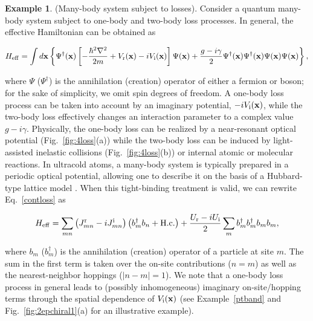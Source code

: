 \documentclass{tADP2e}
\theoremstyle{plain}
\newcommand{\eqn}[1]{
\begin{eqnarray}
	#1
\end{eqnarray}
}
\theoremstyle{plain}
\theoremstyle{definition}
\newtheorem{example}{Example}[section]
\newcommand{\exmp}[1]{
\begin{example}
	#1
\end{example}
}
\begin{document}
\exmp{(Many-body system subject to losses). 
Consider a quantum many-body system subject to one-body and two-body loss processes. In general, the effective Hamiltonian can be obtained as
\eqn{\label{contloss}
H_{{\rm eff}}=\int d{\bf x}\left\{ \Psi^{\dagger}({\bf x})\left[-\frac{\hbar^{2}\nabla^{2}}{2m}+V_{\rm r}({\bf x})-iV_{\rm i}({\bf x})\right]\Psi({\bf x})+\frac{g-i\gamma}{2}\Psi^{\dagger}({\bf x})\Psi^{\dagger}({\bf x})\Psi({\bf x})\Psi({\bf x})\right\}, \nonumber\\
}
where $\Psi$ ($\Psi^\dagger$) is the annihilation (creation) operator of either a fermion or boson; for the sake of simplicity, we omit spin degrees of freedom. A one-body loss process can be taken into account by an imaginary potential, $-iV_{\rm i}({\bf x})$, while the two-body loss effectively changes an interaction parameter to a complex value $g-i\gamma$. Physically, the one-body loss can be realized by a near-resonant optical potential (Fig.~\ref{fig:4loss}(a)) while the two-body loss can be induced by light-assisted inelastic collisions (Fig.~\ref{fig:4loss}(b)) or internal atomic or molecular reactions. In ultracold atoms, a many-body system is typically prepared in a periodic optical potential, allowing one to describe it on the basis of a Hubbard-type lattice model \cite{GEM08,YA16crit}. When this tight-binding treatment is valid, we can rewrite Eq.~\eqref{contloss} as
\eqn{\label{latticeloss}
H_{{\rm eff}}=\sum_{mn}\left(J_{mn}^{\rm r}-iJ_{mn}^{\rm i}\right)\left(b_{m}^{\dagger}b_{n}+{\rm H.c.}\right)+\frac{U_{\rm r}-iU_{\rm i}}{2}\sum_{m}b_{m}^{\dagger}b_{m}^{\dagger}b_{m}b_{m},
} 
where $b_m$ ($b^\dagger_m$) is the annihilation (creation) operator of a particle at site $m$.  The sum in the first term is taken over the on-site contributions ($n=m$) as well as the nearest-neighbor hoppings ($|n-m|=1$). We note that a one-body loss process in general leads to (possibly inhomogeneous) imaginary on-site/hopping terms through the spatial dependence of $V_{\rm i}({\bf x})$ (see Example~\ref{ptband} and Fig.~\ref{fig:2epchiral1}(a) for an illustrative example).
}

\vspace{5pt}

\end{document}
